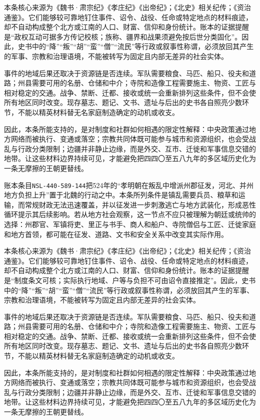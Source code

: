 本条核心来源为《魏书·肃宗纪》《孝庄纪》《出帝纪》；《北史》相关纪传；《资治通鉴》。它们能够较可靠地钉住事件、诏令、战役、任命或特定地点的材料痕迹，却不自动构成整个北方或江南的人口、财富、信仰和身份统计。账本的证据提醒是“政权互动可据多方传记校核；族称、疆界和战果须避免按后世分类固化”。因此，史书中的“降”“叛”“胡”“蛮”“僧”“流民”等行政或叙事性称谓，必须放回其产生的军事、宗教和治理语境，不能被转写为固定且内部无差异的社会实体。

事件的地域后果还取决于资源链是否连续。军队需要粮食、马匹、船只、役夫和道路；州县需要可用的名册、仓储和中介；寺院和造像工程需要施主、物资、工匠与相对稳定的交通。战争、禁断、迁都、接收或统一会重新排列这些条件，但不会使所有地区同时改变。现存墓志、题记、文书、遗址与后出的史书各自照亮少数环节，不能以精英材料替无名家庭制造确定的动机或收支。

因此，本条所能支持的，是对制度和社群如何相遇的限定性解释：中央政策通过地方网络而被执行、变通或落空；宗教共同体既可能参与城市和资源组织，也会受战乱与行政分类限制；边疆并非静止边缘，而是外交、互市、迁徙和军事信息交错的地带。让这些材料边界持续可见，才能避免把四四〇至五八九年的多区域历史化为一条无摩擦的王朝更替线。

账本条目\texttt{NSL-440-589-144}把524年的“孝明朝在叛乱中增派州郡征发，河北、并州地方负担上升”置于北魏的行动之中。本条所列条件是镇乱需要兵员、粮草和运输，而常规财政无法迅速覆盖，并以征发进一步刺激逃亡与地方武装化，形成恶性循环提示其后续影响。若从地方社会观察，这一节点不应只被理解为朝廷或统帅的选择：州郡官、军镇将吏、里正与书手、商人和船户、寺院僧侣与工匠、迁徙家庭和地方首领，都可能在征发、道路、文书和安全关系中改变其实际作用。

本条核心来源为《魏书·肃宗纪》《孝庄纪》《出帝纪》；《北史》相关纪传；《资治通鉴》。它们能够较可靠地钉住事件、诏令、战役、任命或特定地点的材料痕迹，却不自动构成整个北方或江南的人口、财富、信仰和身份统计。账本的证据提醒是“制度条文可核；实际执行地域、户等与负担不可由诏令直接推定”。因此，史书中的“降”“叛”“胡”“蛮”“僧”“流民”等行政或叙事性称谓，必须放回其产生的军事、宗教和治理语境，不能被转写为固定且内部无差异的社会实体。

事件的地域后果还取决于资源链是否连续。军队需要粮食、马匹、船只、役夫和道路；州县需要可用的名册、仓储和中介；寺院和造像工程需要施主、物资、工匠与相对稳定的交通。战争、禁断、迁都、接收或统一会重新排列这些条件，但不会使所有地区同时改变。现存墓志、题记、文书、遗址与后出的史书各自照亮少数环节，不能以精英材料替无名家庭制造确定的动机或收支。

因此，本条所能支持的，是对制度和社群如何相遇的限定性解释：中央政策通过地方网络而被执行、变通或落空；宗教共同体既可能参与城市和资源组织，也会受战乱与行政分类限制；边疆并非静止边缘，而是外交、互市、迁徙和军事信息交错的地带。让这些材料边界持续可见，才能避免把四四〇至五八九年的多区域历史化为一条无摩擦的王朝更替线。

